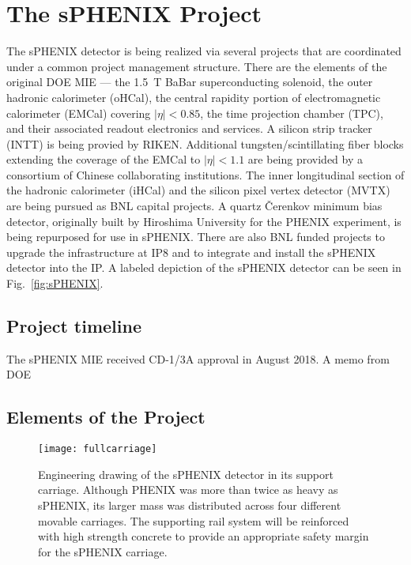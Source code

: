 \chapter{The sPHENIX Project}
\label{chap:project}

The sPHENIX detector is being realized via several projects that are
coordinated under a common project management structure.  There are
the elements of the original DOE MIE --- the 1.5~T BaBar
superconducting solenoid, the outer hadronic calorimeter (oHCal), the
central rapidity portion of electromagnetic calorimeter (EMCal)
covering $|\eta| < 0.85$, the time projection chamber (TPC), and their
associated readout electronics and services.  A silicon strip tracker
(INTT) is being provied by RIKEN.  Additional tungsten/scintillating
fiber blocks extending the coverage of the EMCal to $|\eta| < 1.1$ are
being provided by a consortium of Chinese collaborating institutions.
The inner longitudinal section of the hadronic calorimeter (iHCal) and
the silicon pixel vertex detector (MVTX) are being pursued as BNL
capital projects.  A quartz \v{C}erenkov minimum bias detector,
originally built by Hiroshima University for the PHENIX experiment, is
being repurposed for use in sPHENIX.  There are also BNL funded
projects to upgrade the infrastructure at IP8 and to integrate and
install the sPHENIX detector into the IP.  A labeled depiction of the
sPHENIX detector can be seen in Fig.~\ref{fig:sPHENIX}.

\section{Project timeline}
\label{sec:timeline}

The sPHENIX MIE received CD-1/3A approval in August 2018.  A memo from DOE 

\section{Elements of the Project}
\label{sec:elements}

\begin{figure}[hbt!]
  \centering
  \texttt{[image: fullcarriage]}
  \caption{Engineering drawing of the sPHENIX detector in its support
    carriage.  Although PHENIX was more than twice as heavy as
    sPHENIX, its larger mass was distributed across four different
    movable carriages.  The supporting rail system will be reinforced
    with high strength concrete to provide an appropriate safety
    margin for the sPHENIX carriage.}
  \label{fig:mbd}
\end{figure}

